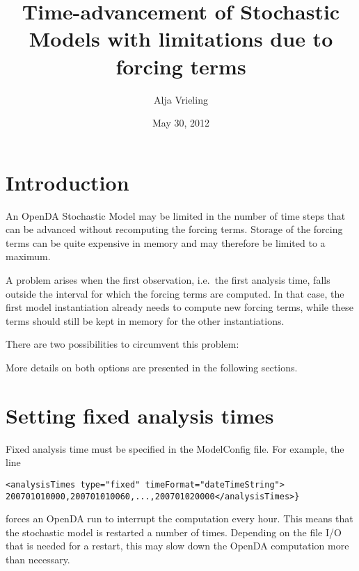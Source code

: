 \documentclass[12pt]{article}
\title{Time-advancement of Stochastic Models with limitations due to forcing terms}
\author{Alja Vrieling}
\date{May 30, 2012}
\begin{document}
\maketitle

\section{Introduction}

An OpenDA Stochastic Model may be limited in the number of time steps that can
be advanced without recomputing the forcing terms. Storage of the forcing terms
can be quite expensive in memory and may therefore be limited to a maximum.

A problem arises when the first observation, i.e.\ the first analysis time,
falls outside the interval for which the forcing terms are computed. In that
case, the first model instantiation already needs to compute new forcing terms,
while these terms should still be kept in memory for the other instantiations.

There are two possibilities to circumvent this problem:
More details on both options are presented in the following sections.

\section{Setting fixed analysis times}

Fixed analysis time must be specified in the ModelConfig file. For example, the
line
\begin{verbatim}
<analysisTimes type="fixed" timeFormat="dateTimeString">
200701010000,200701010060,...,200701020000</analysisTimes>}
\end{verbatim}
forces an OpenDA run to interrupt the computation every hour. This means that
the stochastic model is restarted a number of times. Depending on the file I/O
that is needed for a restart, this may slow down the OpenDA computation more
than necessary.
\end{document}
